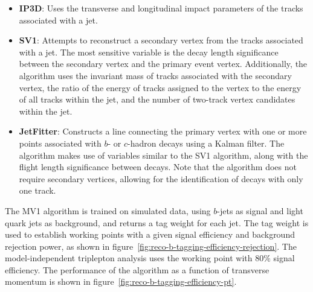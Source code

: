 \begin{itemize}
	\item \textbf{IP3D}: Uses the transverse and longitudinal impact parameters of the tracks associated with a jet.
	\item \textbf{SV1}: Attempts to reconstruct a secondary vertex from the tracks associated with a jet. The most sensitive variable is the decay length significance between the secondary vertex and the primary event vertex. Additionally, the algorithm uses the invariant mass of tracks associated with the secondary vertex, the ratio of the energy of tracks assigned to the vertex to the energy of all tracks within the jet, and the number of two-track vertex candidates within the jet. 
	\item \textbf{JetFitter}: Constructs a line connecting the primary vertex with one or more points associated with $b$- or $c$-hadron decays using a Kalman filter. The algorithm makes use of variables similar to the SV1 algorithm, along with the flight length significance between decays. Note that the algorithm does not require secondary vertices, allowing for the identification of decays with only one track. 
\end{itemize}

The MV1 algorithm is trained on simulated data, using $b$-jets as signal and light quark jets as background, and returns a tag weight for each jet. The tag weight is used to establish working points with a given signal efficiency and background rejection power, as shown in figure~\ref{fig:reco-b-tagging-efficiency-rejection}. The model-independent triplepton analysis uses the working point with $80\%$ signal efficiency. The performance of the algorithm as a function of transverse momentum is shown in figure~\ref{fig:reco-b-tagging-efficiency-pt}.

